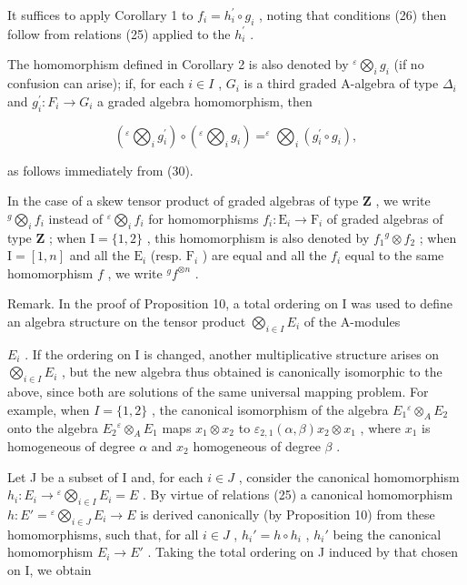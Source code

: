 It suffices to apply Corollary 1 to \(f_{i} = h_{i}^{\prime} \circ g_{i}\) , noting that conditions (26) then follow from relations (25) applied to the \(h_{i}^{\prime}\) .

The homomorphism defined in Corollary 2 is also denoted by \({}^{\varepsilon}\bigotimes_{i} g_{i}\) (if no confusion can arise); if, for each \(i \in I\) , \(G_{i}\) is a third graded A-algebra of type \(\Delta_{i}\) and \(g_{i}^{\prime}: F_{i} \to G_{i}\) a graded algebra homomorphism, then

\[
\left(^ {\varepsilon} \bigotimes_ {i} g _ {i} ^ {\prime}\right) \circ \left(^ {\varepsilon} \bigotimes_ {i} g _ {i}\right) = ^ {\varepsilon} \bigotimes_ {i} \left(g _ {i} ^ {\prime} \circ g _ {i}\right),\tag{31}
\]

as follows immediately from (30).

In the case of a skew tensor product of graded algebras of type \(\mathbf{Z}\) , we write \({}^{g}\bigotimes_{i}f_{i}\) instead of \({}^{\varepsilon}\bigotimes_{i}f_{i}\) for homomorphisms \(f_{i}: \mathrm{E}_{i} \to \mathrm{F}_{i}\) of graded algebras of type \(\mathbf{Z}\) ; when \(\mathrm{I} = \{1, 2\}\) , this homomorphism is also denoted by \(f_{1}{}^{g}\otimes f_{2}\) ; when \(\mathrm{I} = [1, n]\) and all the \(\mathrm{E}_{i}\) (resp. \(\mathrm{F}_{i}\) ) are equal and all the \(f_{i}\) equal to the same homomorphism \(f\) , we write \({}^{g}f^{\otimes n}\) .

Remark. In the proof of Proposition 10, a total ordering on I was used to define an algebra structure on the tensor product \(\bigotimes_{i\in I}E_i\) of the A-modules

\(E_{i}\) . If the ordering on I is changed, another multiplicative structure arises on \(\bigotimes_{i\in I}E_{i}\) , but the new algebra thus obtained is canonically isomorphic to the above, since both are solutions of the same universal mapping problem. For example, when \(I=\{1,2\}\) , the canonical isomorphism of the algebra \(E_{1}{}^{\varepsilon}\otimes_{A}E_{2}\) onto the algebra \(E_{2}{}^{\varepsilon}\otimes_{A}E_{1}\) maps \(x_{1}\otimes x_{2}\) to \(\varepsilon_{2,1}(\alpha,\beta)x_{2}\otimes x_{1}\) , where \(x_{1}\) is homogeneous of degree \(\alpha\) and \(x_{2}\) homogeneous of degree \(\beta\) .

Let J be a subset of I and, for each \(i \in J\) , consider the canonical homomorphism \(h_{i}: E_{i} \to {}^{\varepsilon}\bigotimes_{i \in I} E_{i} = E\) . By virtue of relations (25) a canonical homomorphism \(h: E' = {}^{\varepsilon}\bigotimes_{i \in J} E_{i} \to E\) is derived canonically (by Proposition 10) from these homomorphisms, such that, for all \(i \in J\) , \(h_{i}' = h \circ h_{i}\) , \(h_{i}'\) being the canonical homomorphism \(E_{i} \to E'\) . Taking the total ordering on J induced by that chosen on I, we obtain

